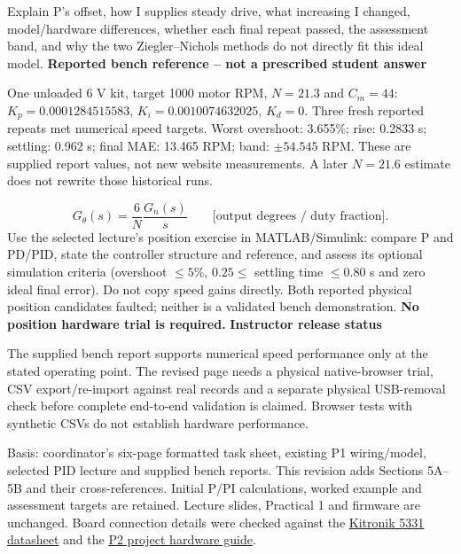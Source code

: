 \documentclass[11pt,a4paper]{article}
\newcommand{\sect}[1]{\vspace{4pt}{\large\bfseries\color{teal}#1}\par\vspace{3pt}}
\newcommand{\sub}[1]{\vspace{4pt}\textbf{#1}\par}
\begin{document}
Explain P's offset, how I supplies steady drive, what increasing I changed, model/hardware differences, whether each final repeat passed, the assessment band, and why the two Ziegler--Nichols methods do not directly fit this ideal model.
\sub{Reported bench reference -- not a prescribed student answer}
{\small One unloaded 6 V kit, target 1000 motor RPM, $N=21.3$ and $C_m=44$: $K_p=0.0001284515583$, $K_i=0.0010074632025$, $K_d=0$. Three fresh reported repeats met numerical speed targets. Worst overshoot: 3.655\%; rise: 0.2833 s; settling: 0.962 s; final MAE: 13.465 RPM; band: $\pm54.545$ RPM. These are supplied report values, not new website measurements. A later $N=21.6$ estimate does not rewrite those historical runs.}
\sect{7. Optional position extension -- simulation only}
\[
G_\theta(s)=\frac{6}{N}\frac{G_n(s)}s\qquad\text{[output degrees / duty fraction].}
\]
{\small Use the selected lecture's position exercise in MATLAB/Simulink: compare P and PD/PID, state the controller structure and reference, and assess its optional simulation criteria (overshoot $\leq5\%$, $0.25\leq$ settling time $\leq0.80$ s and zero ideal final error). Do not copy speed gains directly. Both reported physical position candidates faulted; neither is a validated bench demonstration. \textbf{No position hardware trial is required.}}
\sub{Instructor release status}
{\fontsize{8.5}{10.5}\selectfont
The supplied bench report supports numerical speed performance only at the stated operating point. The revised page needs a physical native-browser trial, CSV export/re-import against real records and a separate physical USB-removal check before complete end-to-end validation is claimed. Browser tests with synthetic CSVs do not establish hardware performance.

Basis: coordinator's six-page formatted task sheet, existing P1 wiring/model, selected PID lecture and supplied bench reports. This revision adds Sections 5A--5B and their cross-references. Initial P/PI calculations, worked example and assessment targets are retained. Lecture slides, Practical 1 and firmware are unchanged. Board connection details were checked against the \href{https://resources.kitronik.co.uk/pdf/5331-compact-motor-driver-raspberry-pi-pico-datasheet.pdf}{Kitronik 5331 datasheet} and the \href{https://github.com/ericwangjcu/EE3600-Motor-Practicals/blob/main/docs/practical2-hardware.md}{P2 project hardware guide}.}
\end{document}
